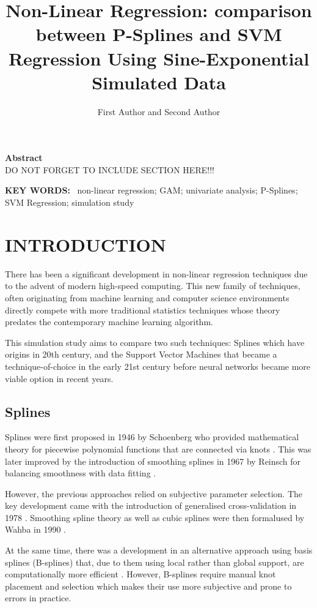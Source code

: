 \documentclass[8pt,twocolumn]{article}
\title{\textbf{Non-Linear Regression: comparison between P-Splines and SVM Regression Using Sine-Exponential Simulated Data}}
\author{First Author and Second Author\\
}
\date{}
\newenvironment{abstractbox}{%
  \begin{mdframed}[backgroundcolor=lightgray,
                   linewidth=0.5pt,
                   linecolor=black,
                   topline=true,
                   bottomline=true,
                   leftline=true,
                   rightline=true,
                   innerleftmargin=10pt,
                   innerrightmargin=10pt,
                   innertopmargin=10pt,
                   innerbottommargin=10pt]
}{%
  \end{mdframed}
}
\begin{document}
\maketitle

\begin{abstractbox}
\noindent\textbf{Abstract} \\
DO NOT FORGET TO INCLUDE SECTION HERE!!!

\vspace{0.5em}
\noindent\textbf{KEY WORDS:} \ non-linear regression; GAM; univariate analysis; P-Splines; SVM Regression; simulation study
\end{abstractbox}


\section{INTRODUCTION}

There has been a significant development in non-linear regression techniques due to the advent of modern high-speed computing.
This new family of techniques, often originating from machine learning and computer science environments directly compete with
more traditional statistics techniques whose theory predates the contemporary machine learning algorithm.

This simulation study aims to compare two such techniques: Splines which have origins in 20th century, and the Support Vector Machines that became
a technique-of-choice in the early 21st century before neural networks became more viable option in recent years.

\subsection{Splines}

Splines were first proposed in 1946 by Schoenberg who provided mathematical theory
for piecewise polynomial functions that are connected via knots \cite{schoenberg1946}. This was later improved by
the introduction of smoothing splines in 1967 by Reinsch for balancing smoothness with data fitting \cite{reinchs1967}.

However, the previous approaches relied on subjective parameter selection. The
key development came with the introduction of generalised cross-validation in 1978 \cite{crwah1978}.
Smoothing spline theory as well as cubic splines were then formalused by Wahba in 1990 \cite{wahba1990}.

At the same time, there was a development in an alternative approach using basis splines (B-splines)
that, due to them using local rather than global support, are computationally more efficient \cite{deboor1978}.
However, B-splines require manual knot placement and selection which makes their
use more subjective and prone to errors in practice.
\end{document}
